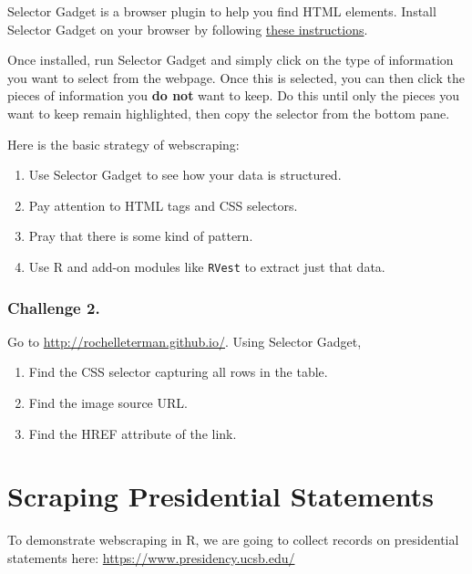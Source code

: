 \documentclass[
]{book}
\providecommand{\tightlist}{%
  \setlength{\itemsep}{0pt}\setlength{\parskip}{0pt}}
\begin{document}
Selector Gadget is a browser plugin to help you find HTML elements. Install Selector Gadget on your browser by following \href{https://selectorgadget.com/}{these instructions}.

Once installed, run Selector Gadget and simply click on the type of information you want to select from the webpage. Once this is selected, you can then click the pieces of information you \textbf{do not} want to keep. Do this until only the pieces you want to keep remain highlighted, then copy the selector from the bottom pane.

Here is the basic strategy of webscraping:

\begin{enumerate}
\def\labelenumi{\arabic{enumi}.}
\tightlist
\item
  Use Selector Gadget to see how your data is structured.
\item
  Pay attention to HTML tags and CSS selectors.
\item
  Pray that there is some kind of pattern.
\item
  Use R and add-on modules like \texttt{RVest} to extract just that data.
\end{enumerate}

\hypertarget{challenge-2.-14}{%
\subsubsection*{Challenge 2.}\label{challenge-2.-14}}

Go to \url{http://rochelleterman.github.io/}. Using Selector Gadget,

\begin{enumerate}
\def\labelenumi{\arabic{enumi}.}
\tightlist
\item
  Find the CSS selector capturing all rows in the table.
\item
  Find the image source URL.
\item
  Find the HREF attribute of the link.
\end{enumerate}

\hypertarget{scraping-presidential-statements}{%
\section{Scraping Presidential Statements}\label{scraping-presidential-statements}}

To demonstrate webscraping in R, we are going to collect records on presidential statements here: \url{https://www.presidency.ucsb.edu/}
\end{document}
